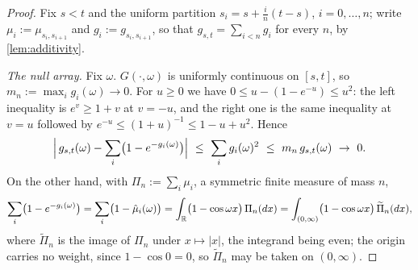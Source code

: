 \begin{proof}
\leanok
Fix $s < t$ and the uniform partition $s_i = s + \tfrac in(t-s)$, $i = 0,\dots,n$; write
$\mu_i := \mu_{s_i,s_{i+1}}$ and $g_i := g_{s_i,s_{i+1}}$, so that
$g_{s,t} = \sum_{i<n} g_i$ for every $n$, by \ref{lem:additivity}.

\emph{The null array.} Fix $\omega$. $G(\cdot,\omega)$ is uniformly continuous on $[s,t]$, so
$m_n := \max_i g_i(\omega) \to 0$. For $u \ge 0$ we have $0 \le u - (1 - e^{-u}) \le u^2$: the
left inequality is $e^v \ge 1 + v$ at $v = -u$, and the right one is the same inequality at
$v = u$ followed by $e^{-u} \le (1+u)^{-1} \le 1 - u + u^2$. Hence
\[
  \Bigl|\,g_{s,t}(\omega) - \sum_i \bigl(1 - e^{-g_i(\omega)}\bigr)\Bigr|
  \ \le\ \sum_i g_i(\omega)^2
  \ \le\ m_n\,g_{s,t}(\omega) \ \to\ 0 .
\]
On the other hand, with $\Pi_n := \sum_i \mu_i$, a symmetric finite measure of mass $n$,
\[
  \sum_i \bigl(1 - e^{-g_i(\omega)}\bigr) = \sum_i \bigl(1 - \hat\mu_i(\omega)\bigr)
  = \int_{\mathbb{R}} \bigl(1 - \cos\omega x\bigr)\,\Pi_n(dx)
  = \int_{(0,\infty)} \bigl(1 - \cos\omega x\bigr)\,\widetilde\Pi_n(dx),
\]
where $\widetilde\Pi_n$ is the image of $\Pi_n$ under $x \mapsto |x|$, the integrand being
even; the origin carries no weight, since $1 - \cos 0 = 0$, so $\widetilde\Pi_n$ may be taken
on $(0,\infty)$.


\end{proof}
